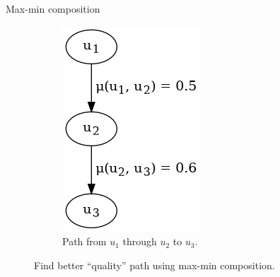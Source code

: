 \begin{frame}
\begin{block}{Max-min composition}
\begin{figure}[htbp]
\begin{subfigure}[t]{0.25\textwidth}
			\includegraphics[width=\linewidth,valign=t]{inc/fuzzy_graph_theory/maxmincomposition_after.png}
			\caption{Path from $u_1$ through $u_2$ to $u_3$.}
		\end{subfigure}
		\caption{Find better ``quality'' path using max-min composition.}
	\end{figure}

	\end{block}
\end{frame}
